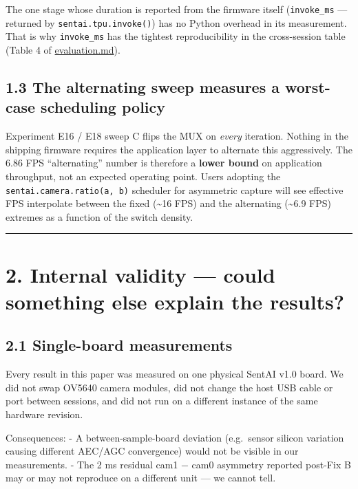 The one stage whose duration is reported from the firmware itself
(\texttt{invoke\_ms} --- returned by \texttt{sentai.tpu.invoke()}) has
no Python overhead in its measurement. That is why \texttt{invoke\_ms}
has the tightest reproducibility in the cross-session table (Table 4 of
\url{evaluation.md}).

\subsection{1.3 The alternating sweep measures a worst-case scheduling
policy}\label{the-alternating-sweep-measures-a-worst-case-scheduling-policy}

Experiment E16 / E18 sweep C flips the MUX on \emph{every} iteration.
Nothing in the shipping firmware requires the application layer to
alternate this aggressively. The 6.86 FPS ``alternating'' number is
therefore a \textbf{lower bound} on application throughput, not an
expected operating point. Users adopting the
\texttt{sentai.camera.ratio(a,\ b)} scheduler for asymmetric capture
will see effective FPS interpolate between the fixed (\textasciitilde16
FPS) and the alternating (\textasciitilde6.9 FPS) extremes as a function
of the switch density.

\begin{center}\rule{0.5\linewidth}{0.5pt}\end{center}

\section{2. Internal validity --- could something else explain the
results?}\label{internal-validity-could-something-else-explain-the-results}

\subsection{2.1 Single-board
measurements}\label{single-board-measurements}

Every result in this paper was measured on one physical SentAI v1.0
board. We did not swap OV5640 camera modules, did not change the host
USB cable or port between sessions, and did not run on a different
instance of the same hardware revision.

Consequences: - A between-sample-board deviation (e.g.~sensor silicon
variation causing different AEC/AGC convergence) would not be visible in
our measurements. - The 2 ms residual cam1 − cam0 asymmetry reported
post-Fix B may or may not reproduce on a different unit --- we cannot
tell.


